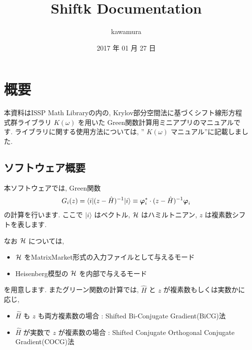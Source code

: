 \documentclass[letterpaper,10pt,dvipdfmx,openany]{sphinxmanual}
\title{Shiftk Documentation}
\date{2017 年 01 月 27 日}
\author{kawamura}
\begin{document}
\maketitle
\tableofcontents
{}\label{index::doc}



\chapter{概要}
\label{shiftk_overview_ja:welcome-to-sample-program-s-documentation}\label{shiftk_overview_ja::doc}\label{shiftk_overview_ja:id1}
本資料はISSP Math
Libraryの内の, Krylov部分空間法に基づくシフト線形方程式群ライブラリ
\(K(\omega)\) を用いた Green関数計算用ミニアプリのマニュアルです.
ライブラリに関する使用方法については, '' \(K(\omega)\) マニュアル''に記載しました.


\section{ソフトウェア概要}
\label{shiftk_overview_ja:id2}
本ソフトウェアでは, Green関数
\begin{gather}
\begin{split}\begin{align}
G_{i}(z) =
\langle i | (z-{\hat H})^{-1}| i \rangle
\equiv
{\boldsymbol \varphi}_i^{*} \cdot (z-{\hat H})^{-1} {\boldsymbol \varphi}_i
\end{align}\end{split}\notag
\end{gather}
の計算を行います.
ここで \(| i \rangle\) はベクトル, \({\cal H}\) はハミルトニアン,
\(z\) は複素数シフトを表します.

なお \({\cal H}\) については,
\begin{itemize}
\item {} 
\({\cal H}\) をMatrixMarket形式の入力ファイルとして与えるモード

\item {} 
Heisenberg模型の \({\cal H}\) を内部で与えるモード

\end{itemize}

を用意します.
またグリーン関数の計算では, \({\hat H}\) と \(z\) が複素数もしくは実数かに応じ,
\begin{itemize}
\item {} 
\({\hat H}\) も \(z\) も両方複素数の場合 : Shifted
Bi-Conjugate Gradient(BiCG)法

\item {} 
\({\hat H}\) が実数で \(z\) が複素数の場合 : Shifted
Conjugate Orthogonal Conjugate Gradient(COCG)法

\end{itemize}
\end{document}
